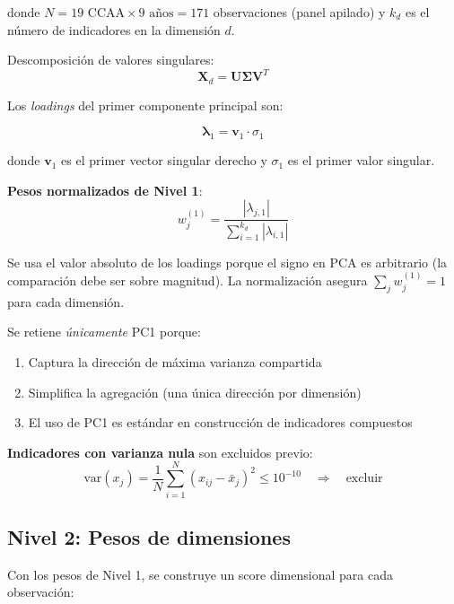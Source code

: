 donde $N = 19 \text{ CCAA} \times 9 \text{ años} = 171$ observaciones (panel apilado) y $k_d$ es el número de indicadores en la dimensión $d$.

Descomposición de valores singulares:
\begin{equation}
    \mathbf{X}_d = \mathbf{U} \boldsymbol{\Sigma} \mathbf{V}^T
\end{equation}

Los \emph{loadings} del primer componente principal son:

\begin{equation}
    \boldsymbol{\lambda}_1 = \mathbf{v}_1 \cdot \sigma_1
\end{equation}

donde $\mathbf{v}_1$ es el primer vector singular derecho y $\sigma_1$ es el primer valor singular.

\textbf{Pesos normalizados de Nivel 1}:
\begin{equation}
    w_{j}^{(1)} = \frac{|\lambda_{j,1}|}{\sum_{i=1}^{k_d} |\lambda_{i,1}|}
    \label{eq:pesos_l1}
\end{equation}

Se usa el valor absoluto de los loadings porque el signo en PCA es arbitrario (la comparación debe ser sobre magnitud). La normalización asegura $\sum_j w_j^{(1)} = 1$ para cada dimensión.

Se retiene \emph{únicamente} PC1 porque:
\begin{enumerate}
    \item Captura la dirección de máxima varianza compartida
    \item Simplifica la agregación (una única dirección por dimensión)
    \item El uso de PC1 es estándar en construcción de indicadores compuestos \citep{oecd2008handbook}
\end{enumerate}

\textbf{Indicadores con varianza nula} son excluidos previo:
\begin{equation}
    \text{var}(x_j) = \frac{1}{N} \sum_{i=1}^{N} (x_{ij} - \bar{x}_j)^2 \leq 10^{-10} \quad \Rightarrow \quad \text{excluir}
\end{equation}

\subsection{Nivel 2: Pesos de dimensiones}

Con los pesos de Nivel 1, se construye un score dimensional para cada observación:

